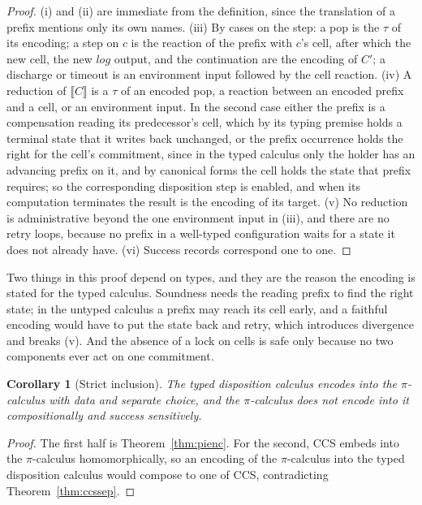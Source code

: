 \documentclass[11pt,openany]{book}
\newtheorem{corollary}[theorem]{Corollary}
\theoremstyle{remark}
\begin{document}
\begin{proof}
(i) and (ii) are immediate from the definition, since the translation of a
prefix mentions only its own names. (iii) By cases on the step: a pop is
the $\tau$ of its encoding; a step on $c$ is the reaction of the prefix
with $c$'s cell, after which the new cell, the new $\mathit{log}$ output,
and the continuation are the encoding of $C'$; a discharge or timeout is
an environment input followed by the cell reaction. (iv) A reduction of
$\llbracket C\rrbracket$ is a $\tau$ of an encoded pop, a reaction between
an encoded prefix and a cell, or an environment input. In the second case
either the prefix is a compensation reading its predecessor's cell, which
by its typing premise holds a terminal state that it writes back
unchanged, or the prefix occurrence holds the right for the cell's
commitment, since in the typed calculus only the holder has an advancing
prefix on it, and by canonical forms the cell holds the state that prefix
requires; so the corresponding
disposition step is enabled, and when its computation terminates the
result is the encoding of its target. (v) No reduction is administrative
beyond the one environment input in (iii), and there are no retry loops,
because no prefix in a well-typed configuration waits for a state it does
not already have. (vi) Success records correspond one to one.
\end{proof}

Two things in this proof depend on types, and they are the reason the
encoding is stated for the typed calculus. Soundness needs the reading
prefix to find the right state; in the untyped calculus a prefix may reach
its cell early, and a faithful encoding would have to put the state back
and retry, which introduces divergence and breaks (v). And the absence of
a lock on cells is safe only because no two components ever act on one
commitment.

\begin{corollary}[Strict inclusion]\label{cor:pistrict}
The typed disposition calculus encodes into the $\pi$-calculus with data
and separate choice, and the $\pi$-calculus does not encode into it
compositionally and success sensitively.
\end{corollary}

\begin{proof}
The first half is Theorem~\ref{thm:pienc}. For the second, CCS embeds into
the $\pi$-calculus homomorphically, so an encoding of the $\pi$-calculus
into the typed disposition calculus would compose to one of CCS,
contradicting Theorem~\ref{thm:ccssep}.
\end{proof}
\end{document}
